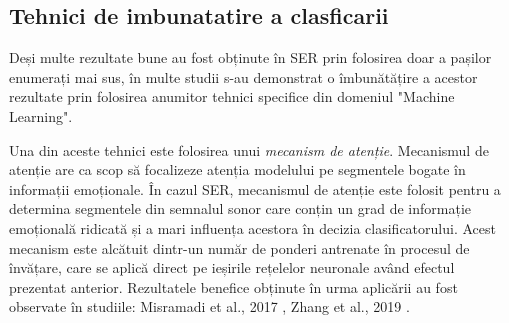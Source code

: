 \documentclass[a4paper,12pt]{book}
\begin{document}
					\subsection{Tehnici de imbunatatire a clasficarii} \label{tehnici}
						Deși multe rezultate bune au fost obținute în SER prin folosirea doar a pașilor enumerați mai sus, în multe studii s-au demonstrat o îmbunătățire a acestor rezultate prin folosirea anumitor tehnici specifice din domeniul "Machine Learning". \par
						Una din aceste tehnici este folosirea unui \textit{mecanism de atenție}. Mecanismul de atenție are ca scop să focalizeze atenția modelului pe segmentele bogate în informații emoționale. În cazul SER, mecanismul de atenție este folosit pentru a determina segmentele din semnalul sonor care conțin un grad de informație emoțională ridicată și a mari influența acestora în decizia clasificatorului. Acest mecanism este alcătuit dintr-un număr de ponderi antrenate în procesul de învățare, care se aplică direct pe ieșirile rețelelor neuronale având efectul prezentat anterior.  Rezultatele benefice obținute în urma aplicării au fost observate în studiile: Misramadi et al., 2017 \cite{misramadi}, Zhang et al., 2019 \cite{zhang} . \par
						
\end{document}
